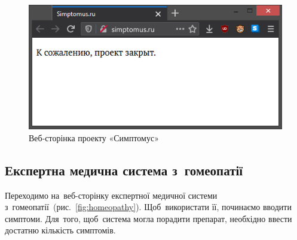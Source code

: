 \documentclass[
  a4paper,
  oneside,
  BCOR = 10mm,
  DIV = 12,
  12pt,
  headings = normal,
]{scrartcl}
\newlength{\gridunitwidth}
\begin{document}
      \begin{figure}[!htbp]
        \centering
        \includegraphics[width = 8 \gridunitwidth]{./assets/01.png}
        \caption{Веб-сторінка проекту «Симптомус»}
        \label{fig:simptomus}
      \end{figure}

    \subsection{Експертна медична система з~гомеопатії}
      Переходимо на~веб-сторінку експертної медичної системи з~гомеопатії~(рис.~\ref{fig:homeopathy}). Щоб~використати її, починаємо вводити симптоми. Для~того, щоб~система могла порадити препарат, необхідно ввести достатню кількість симптомів.
\end{document}
